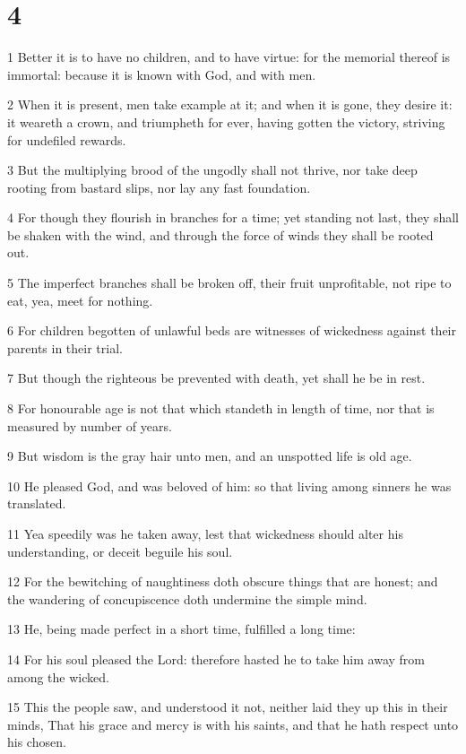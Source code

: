 \chapter{4}

\par 1 Better it is to have no children, and to have virtue: for the memorial thereof is immortal: because it is known with God, and with men.
\par 2 When it is present, men take example at it; and when it is gone, they desire it: it weareth a crown, and triumpheth for ever, having gotten the victory, striving for undefiled rewards.
\par 3 But the multiplying brood of the ungodly shall not thrive, nor take deep rooting from bastard slips, nor lay any fast foundation.
\par 4 For though they flourish in branches for a time; yet standing not last, they shall be shaken with the wind, and through the force of winds they shall be rooted out.
\par 5 The imperfect branches shall be broken off, their fruit unprofitable, not ripe to eat, yea, meet for nothing.
\par 6 For children begotten of unlawful beds are witnesses of wickedness against their parents in their trial.
\par 7 But though the righteous be prevented with death, yet shall he be in rest.
\par 8 For honourable age is not that which standeth in length of time, nor that is measured by number of years.
\par 9 But wisdom is the gray hair unto men, and an unspotted life is old age.
\par 10 He pleased God, and was beloved of him: so that living among sinners he was translated.
\par 11 Yea speedily was he taken away, lest that wickedness should alter his understanding, or deceit beguile his soul.
\par 12 For the bewitching of naughtiness doth obscure things that are honest; and the wandering of concupiscence doth undermine the simple mind.
\par 13 He, being made perfect in a short time, fulfilled a long time:
\par 14 For his soul pleased the Lord: therefore hasted he to take him away from among the wicked.
\par 15 This the people saw, and understood it not, neither laid they up this in their minds, That his grace and mercy is with his saints, and that he hath respect unto his chosen.
